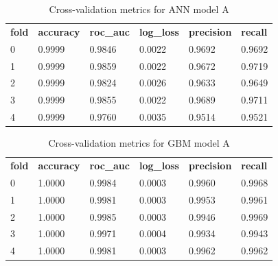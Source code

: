 \documentclass{article}
\begin{document}
\begin{table}[H]
\begin{tabular}{llllll}
\textbf{fold} & \textbf{accuracy} & \textbf{roc\_auc} & \textbf{log\_loss} & \textbf{precision} & \textbf{recall} \\
0             & 0.9999            & 0.9846            & 0.0022             & 0.9692             & 0.9692          \\
1             & 0.9999            & 0.9859            & 0.0022             & 0.9672             & 0.9719          \\
2             & 0.9999            & 0.9824            & 0.0026             & 0.9633             & 0.9649          \\
3             & 0.9999            & 0.9855            & 0.0022             & 0.9689             & 0.9711          \\
4             & 0.9999            & 0.9760            & 0.0035             & 0.9514             & 0.9521         
\end{tabular}
\caption{Cross-validation metrics for ANN model A}
\end{table}

\begin{table}[H]
\begin{tabular}{llllll}
\textbf{fold} & \textbf{accuracy} & \textbf{roc\_auc} & \textbf{log\_loss} & \textbf{precision} & \textbf{recall} \\
0             & 1.0000            & 0.9984            & 0.0003             & 0.9960             & 0.9968          \\
1             & 1.0000            & 0.9981            & 0.0003             & 0.9953             & 0.9961          \\
2             & 1.0000            & 0.9985            & 0.0003             & 0.9946             & 0.9969          \\
3             & 1.0000            & 0.9971            & 0.0004             & 0.9934             & 0.9943          \\
4             & 1.0000            & 0.9981            & 0.0003             & 0.9962             & 0.9962         
\end{tabular}
\caption{Cross-validation metrics for GBM model A}
\end{table}
\end{document}
